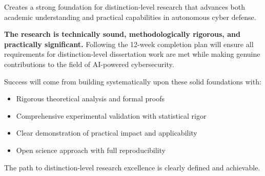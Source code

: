 \documentclass[12pt,a4paper]{article}
\begin{document}
Creates a strong foundation for distinction-level research that advances both academic understanding and practical capabilities in autonomous cyber defense.

\textbf{The research is technically sound, methodologically rigorous, and practically significant.} Following the 12-week completion plan will ensure all requirements for distinction-level dissertation work are met while making genuine contributions to the field of AI-powered cybersecurity.

Success will come from building systematically upon these solid foundations with:
\begin{itemize}
    \item Rigorous theoretical analysis and formal proofs
    \item Comprehensive experimental validation with statistical rigor
    \item Clear demonstration of practical impact and applicability
    \item Open science approach with full reproducibility
\end{itemize}

The path to distinction-level research excellence is clearly defined and achievable.
\end{document}
